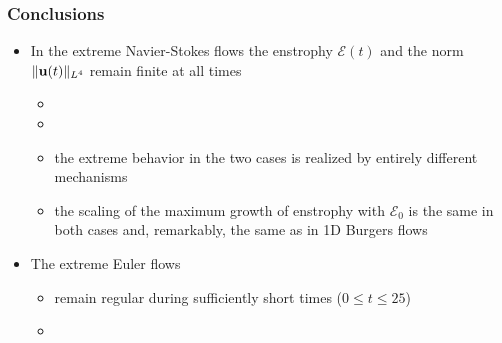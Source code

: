 \documentclass{beamer}
\def\Bmp#1{ \begin{minipage}{#1} }
\def\Emp{ \end{minipage} }
\def\E{{\mathcal{E}}}
\def\red#1{{\color{red}{ #1 }}}
\def\blue#1{{\color{blue}{ #1 }}}
\def\u{{\bf u}}
\begin{document}
\frame
{
\frametitle{Conclusions}
\vspace{-0.1cm}
\hspace*{-1.0cm}
\Bmp{12cm}
\raggedright
\small
\begin{itemize}
\item<1-> In the extreme Navier-Stokes flows the enstrophy $\E(t)$ and the norm
  $\|\u(t)\|_{L^4}$ remain finite at all times
\begin{itemize}
\item<2-> \red{hence, even in such worst-case scenario there is no evidence
  for formation of singularity in finite time}

\smallskip
\item<3-> 
\blue{however, we do not know if the maximizers found are global}


\smallskip
\item<4-> the extreme behavior in the two cases is realized by
  entirely different mechanisms

\smallskip
\item<5-> the scaling of the maximum growth of enstrophy with $\E_0$
  is the same in both cases and, remarkably, the same as in 1D Burgers
  flows

\end{itemize}

\medskip
\item<6-> The extreme Euler flows
  \begin{itemize}
\item<7-> remain regular during sufficiently short times ($0 \le t  \le 25$)

  \smallskip
\item<8-> \blue{appear to form a singularity at a later time ($t >
    51.25$)} \\ \smallskip
  \visible<9->{\red{$\Longrightarrow$ the singular flow structure is nearly axisymmetric!}}
  
\end{itemize}
  
\end{itemize}
\Emp
}
\end{document}
